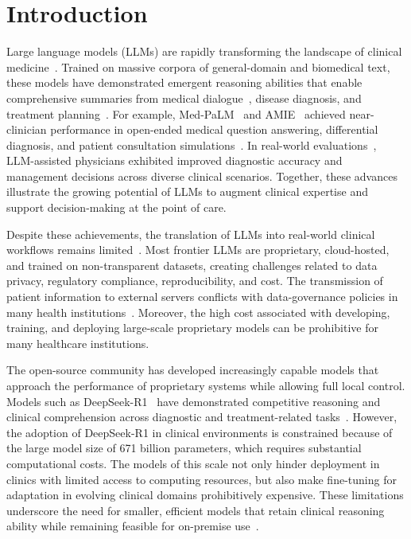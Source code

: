\documentclass[10pt,journal,compsoc, onecolumn]{IEEEtran}
\begin{document}
\IEEEpeerreviewmaketitle

\section*{Introduction}
Large language models (LLMs) are rapidly transforming the landscape of clinical medicine~\cite{thirunavukarasu2023llmedicine, omiye2024pitfalls}. Trained on massive corpora of general-domain and biomedical text, these models have demonstrated emergent reasoning abilities that enable comprehensive summaries from medical dialogue~\cite{NMed-LLMSummary}, disease diagnosis, and treatment planning~\cite{MedFound}. For example, Med-PaLM~\cite{MedPALM1,MedPALM2} and AMIE~\cite{AMIE-diagnosis,AMIE-conversation} achieved near-clinician performance in open-ended medical question answering, differential diagnosis, and patient consultation simulations~\cite{qiu2025medrench}. In real-world evaluations~\cite{openai-AIConsult, goh2025gpt4rct}, LLM-assisted physicians exhibited improved diagnostic accuracy and management decisions across diverse clinical scenarios. Together, these advances illustrate the growing potential of LLMs to augment clinical expertise and support decision-making at the point of care.

Despite these achievements, the translation of LLMs into real-world clinical workflows remains limited~\cite{hager2024limitations}. Most frontier LLMs are proprietary, cloud-hosted, and trained on non-transparent datasets, creating challenges related to data privacy, regulatory compliance, reproducibility, and cost. The transmission of patient information to external servers conflicts with data-governance policies in many health institutions~\cite{kim2025privacy, clusmann2025implementing}. Moreover, the high cost associated with developing, training, and deploying large-scale proprietary models can be prohibitive for many healthcare institutions. 

The open-source community has developed increasingly capable models that approach the performance of proprietary systems while allowing full local control. Models such as DeepSeek-R1~\cite{DeepSeek-R1} have demonstrated competitive reasoning and clinical comprehension across diagnostic and treatment-related tasks~\cite{eval-deepseek,eval-deepseek125Patients, wang2025jarvis, moell2025deepseek, deepseek2025cme}. 
However, the adoption of DeepSeek-R1 in clinical environments is constrained because of the large model size of 671 billion parameters, which requires substantial computational costs. The models of this scale not only hinder deployment in clinics with limited access to computing resources, but also make fine-tuning for adaptation in evolving clinical domains prohibitively expensive. 
These limitations underscore the need for smaller, efficient models that retain clinical reasoning ability while remaining feasible for on-premise use~\cite{garg2025rise, builtjes2025leveraging}.
\end{document}
